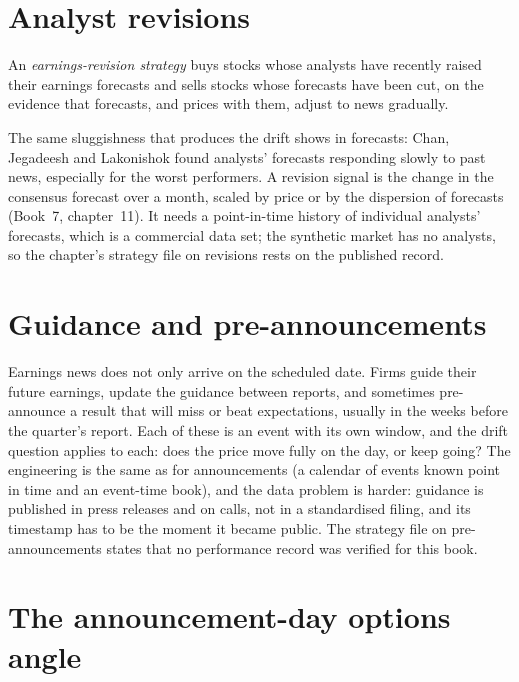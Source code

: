 \section{Analyst revisions}

\begin{definition}\label{def:s1:earnings:revision}
An \emph{earnings-revision strategy} buys stocks whose analysts have recently raised their earnings forecasts and sells
stocks whose forecasts have been cut, on the evidence that forecasts, and prices with them, adjust to news gradually.
\end{definition}

The same sluggishness that produces the drift shows in forecasts: Chan, Jegadeesh and Lakonishok found analysts' forecasts responding slowly to past news,
especially for the worst performers. A revision signal is the change in the consensus forecast over a month, scaled by price or by the dispersion of
forecasts (Book~7, chapter~11). It needs a point-in-time history of individual analysts' forecasts, which is a commercial data set; the synthetic market has
no analysts, so the chapter's strategy file on revisions rests on the published record.

\section{Guidance and pre-announcements}

Earnings news does not only arrive on the scheduled date. Firms guide their future earnings, update the guidance between reports, and sometimes
pre-announce a result that will miss or beat expectations, usually in the weeks before the quarter's report. Each of these is an event with its own window,
and the drift question applies to each: does the price move fully on the day, or keep going? The engineering is the same as for announcements (a calendar
of events known point in time and an event-time book), and the data problem is harder: guidance is published in press releases and on calls, not in a
standardised filing, and its timestamp has to be the moment it became public. The strategy file on pre-announcements states that no performance record was
verified for this book.

\section{The announcement-day options angle}

